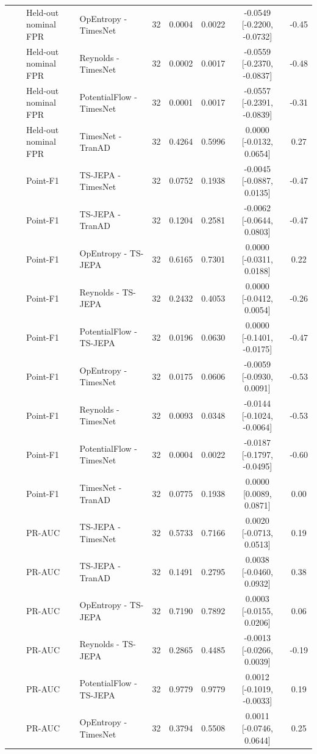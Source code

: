 {\begin{longtable}{@{}llllccccc@{}}
 &  & Held-out nominal FPR & OpEntropy - TimesNet & 32 & 0.0004 & 0.0022 & -0.0549 [-0.2200, -0.0732] & -0.45 \\
 &  & Held-out nominal FPR & Reynolds - TimesNet & 32 & 0.0002 & 0.0017 & -0.0559 [-0.2370, -0.0837] & -0.48 \\
 &  & Held-out nominal FPR & PotentialFlow - TimesNet & 32 & 0.0001 & 0.0017 & -0.0557 [-0.2391, -0.0839] & -0.31 \\
 &  & Held-out nominal FPR & TimesNet - TranAD & 32 & 0.4264 & 0.5996 & 0.0000 [-0.0132, 0.0654] & 0.27 \\
 &  & Point-F1 & TS-JEPA - TimesNet & 32 & 0.0752 & 0.1938 & -0.0045 [-0.0887, 0.0135] & -0.47 \\
 &  & Point-F1 & TS-JEPA - TranAD & 32 & 0.1204 & 0.2581 & -0.0062 [-0.0644, 0.0803] & -0.47 \\
 &  & Point-F1 & OpEntropy - TS-JEPA & 32 & 0.6165 & 0.7301 & 0.0000 [-0.0311, 0.0188] & 0.22 \\
 &  & Point-F1 & Reynolds - TS-JEPA & 32 & 0.2432 & 0.4053 & 0.0000 [-0.0412, 0.0054] & -0.26 \\
 &  & Point-F1 & PotentialFlow - TS-JEPA & 32 & 0.0196 & 0.0630 & 0.0000 [-0.1401, -0.0175] & -0.47 \\
 &  & Point-F1 & OpEntropy - TimesNet & 32 & 0.0175 & 0.0606 & -0.0059 [-0.0930, 0.0091] & -0.53 \\
 &  & Point-F1 & Reynolds - TimesNet & 32 & 0.0093 & 0.0348 & -0.0144 [-0.1024, -0.0064] & -0.53 \\
 &  & Point-F1 & PotentialFlow - TimesNet & 32 & 0.0004 & 0.0022 & -0.0187 [-0.1797, -0.0495] & -0.60 \\
 &  & Point-F1 & TimesNet - TranAD & 32 & 0.0775 & 0.1938 & 0.0000 [0.0089, 0.0871] & 0.00 \\
 &  & PR-AUC & TS-JEPA - TimesNet & 32 & 0.5733 & 0.7166 & 0.0020 [-0.0713, 0.0513] & 0.19 \\
 &  & PR-AUC & TS-JEPA - TranAD & 32 & 0.1491 & 0.2795 & 0.0038 [-0.0460, 0.0932] & 0.38 \\
 &  & PR-AUC & OpEntropy - TS-JEPA & 32 & 0.7190 & 0.7892 & 0.0003 [-0.0155, 0.0206] & 0.06 \\
 &  & PR-AUC & Reynolds - TS-JEPA & 32 & 0.2865 & 0.4485 & -0.0013 [-0.0266, 0.0039] & -0.19 \\
 &  & PR-AUC & PotentialFlow - TS-JEPA & 32 & 0.9779 & 0.9779 & 0.0012 [-0.1019, -0.0033] & 0.19 \\
 &  & PR-AUC & OpEntropy - TimesNet & 32 & 0.3794 & 0.5508 & 0.0011 [-0.0746, 0.0644] & 0.25 \\

\end{longtable}}
